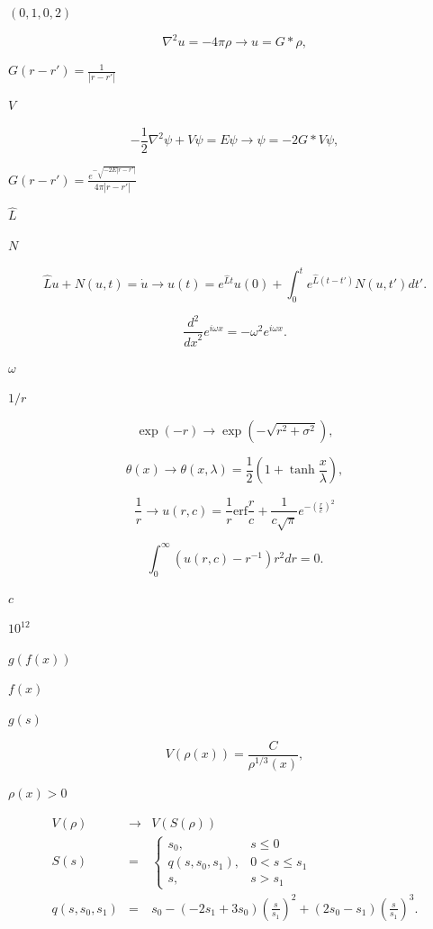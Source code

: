 \documentclass{article}
\begin{document}
$(0,1,0,2)$
\pagebreak

\[
\nabla^{2} u = -4\pi\rho \to u=G \ast \rho,
\]
\pagebreak

$G(r-r')=\frac{1}{|r-r'|}$
\pagebreak

$V$
\pagebreak

\[
- \frac{1}{2} \nabla^{2} \psi + V\psi = E \psi \to \psi = -2G \ast V\psi,
\]
\pagebreak

$G(r-r')=\frac{e^{-\sqrt{-2E|r-r'|}}}{4\pi |r-r'|} $
\pagebreak

$\hat{L}$
\pagebreak

$N$
\pagebreak

\[
\hat{L}u + N(u,t) = \dot{u} \to u(t) = e^{\hat{L} t} u(0) + \int _{0}^{t} e^{\hat{L} (t-t')} N(u,t') \mathit{d}t'.
\]
\pagebreak

\[
\frac{d^{2}}{\mathit{dx}^{2}}e^{i\omega x}=-\omega ^{2}e^{i\omega x}.
\]
\pagebreak

$\omega$
\pagebreak

$1/r$
\pagebreak

\[
\exp(-r) \to \exp (-\sqrt{r^{2}+\sigma ^{2}}),
\]
\pagebreak

\[
\theta(x) \to \theta(x, \lambda) = \frac{1}{2} (1 + \tanh\frac{x}{\lambda}),
\]
\pagebreak

\[
\frac{1}{r} \to u(r,c) = \frac{1}{r} \mathrm{erf} \frac{r}{c} + \frac{1}{c\sqrt{\pi}} e^{-\left( \frac{r}{c} \right)^{2}}
\]
\pagebreak

\[
\int_{0}^{\infty} \left(u(r, c) - r^{-1}\right) r^{2} d\mathit{r} = 0.
\]
\pagebreak

$c$
\pagebreak

$10^{12}$
\pagebreak

$g(f(x))$
\pagebreak

$f(x)$
\pagebreak

$g(s)$
\pagebreak

\[
V(\rho(x)) = \frac{C}{\rho^{1/3}(x)},
\]
\pagebreak

$\rho (x)>0$
\pagebreak

\begin{eqnarray*}
V(\rho) & \to & V(S(\rho)) \\
S(s) & = & \left\{ \begin{array}{ll} s_{0}, & s\le 0 \\ q(s, s_{0}, s_{1}), & 0 < s \le s_{1} \\ s, & s > s_{1} \end{array} \right. \\
q(s, s_{0}, s_{1}) & = & s_{0} - (-2s_{1} + 3s_{0}) \left( \frac{s}{s_{1}} \right)^{2} + (2s_{0} - s_{1}) \left(\frac{s}{s_{1}}\right)^{3}.
\end{eqnarray*}
\pagebreak
\end{document}

